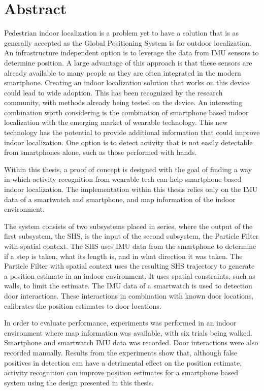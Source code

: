 %
\chapter*{Abstract}%

Pedestrian indoor localization is a problem  yet to have a solution that is as generally accepted as the Global Positioning System is for outdoor localization. An infrastructure independent option is to leverage the data from \ac{IMU} sensors to determine position. A large advantage of this approach is that these sensors are already available to many people as they are often integrated in the modern smartphone. Creating an indoor localization solution that works on this device could lead to wide adoption. This has been recognized by the research community, with methods already being tested on the device. An interesting combination worth considering is the combination of smartphone based indoor localization with the emerging market of wearable technology. This new technology has the potential to provide additional information that could improve indoor localization. One option is to detect activity that is not easily detectable from smartphones alone, such as those performed with hands.

Within this thesis, a proof of concept is designed with the goal of finding a way in which activity recognition from wearable tech can help smartphone based indoor localization.
The implementation within this thesis relies only on the \ac{IMU} data of a smartwatch and smartphone, and map information of the indoor environment.  \par 

The system consists of two subsystems placed in series, where the output of the first subsystem, the \ac{SHS}, is the input of the second subsystem, the Particle Filter with  spatial context. The \ac{SHS} uses \ac{IMU} data from the smartphone to determine if a step is taken, what its length is, and in what direction it was taken. 
The Particle Filter with spatial context uses the resulting \ac{SHS} trajectory to generate a position estimate in an indoor environment. It uses spatial constraints, such as walls, to limit the estimate. The \ac{IMU} data of a smartwatch is used to detection door interactions. These interactions in combination with known door locations, calibrates the position estimates to door locations. \par 

In order to evaluate performance, experiments was performed in an indoor environment where map information was available, with six trials being walked. Smartphone and smartwatch {IMU} data was recorded. Door interactions were also recorded manually.
Results from the experiments show that, although false positives in detection can have a detrimental effect on the position estimate, activity recognition can improve position estimates for a smartphone based system using the design presented in this thesis.

